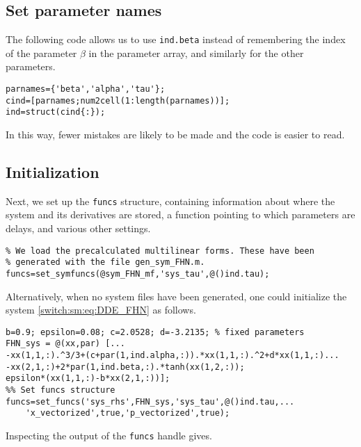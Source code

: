 \subsection{Set parameter names}
The following code allows us to use \lstinline[keywordstyle=\color{darkblue}]{ind.beta} instead of remembering the index of the parameter $\beta$ in the parameter array, and similarly for the other parameters.
\begin{lstlisting}[style=customMatlab]
%% Set parameter names
parnames={'beta','alpha','tau'};
cind=[parnames;num2cell(1:length(parnames))];
ind=struct(cind{:});
\end{lstlisting}
In this way, fewer mistakes are likely to be made and the code is easier to read.

\subsection{Initialization}
Next, we set up the \lstinline|funcs| structure, containing information about where the system and its derivatives are stored, a function pointing to which parameters are delays, and various other settings.
\begin{lstlisting}[style=customMatlab]
%% Set the funcs structure
% We load the precalculated multilinear forms. These have been
% generated with the file gen_sym_FHN.m.
funcs=set_symfuncs(@sym_FHN_mf,'sys_tau',@()ind.tau);
\end{lstlisting}
Alternatively, when no system files have been generated, one could initialize the system \cref{switch:sm:eq:DDE_FHN} as follows.
\begin{lstlisting}[style=customMatlab,caption=Define system without a system file, label={switch:sm:lst:wo_system_file}]
%% Define the system
b=0.9; epsilon=0.08; c=2.0528; d=-3.2135; % fixed parameters
FHN_sys = @(xx,par) [...
-xx(1,1,:).^3/3+(c+par(1,ind.alpha,:)).*xx(1,1,:).^2+d*xx(1,1,:)...
-xx(2,1,:)+2*par(1,ind.beta,:).*tanh(xx(1,2,:));
epsilon*(xx(1,1,:)-b*xx(2,1,:))];
%% Set funcs structure
funcs=set_funcs('sys_rhs',FHN_sys,'sys_tau',@()ind.tau,...
    'x_vectorized',true,'p_vectorized',true);			
\end{lstlisting}
Inspecting the output of the \lstinline|funcs| handle gives.
